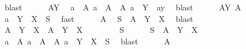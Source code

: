 \begin{isabellebody}
\ blast\isanewline
\ \ \ \ \isamarkupfalse%
\ A{\isacharunderscore}{\kern0pt}Y{}\ \isamarkupfalse%
\ a\ \ A{}{\isacharcolon}{\kern0pt}\ {\isachardoublequoteopen}a\ {\isasymin}\ A{\isachardoublequoteclose}\ \ A{}{\isacharcolon}{\kern0pt}\ {\isachardoublequoteopen}a\ {\isasyminter}\ Y\ {\isacharequal}{\kern0pt}\ a{\isacharunderscore}{\kern0pt}y{\isachardoublequoteclose}\ \isamarkupfalse%
\ blast\isanewline
\ \ \ \ \isamarkupfalse%
\ A{\isacharunderscore}{\kern0pt}Y{}\ A{}\ \isamarkupfalse%
\ {\isachardoublequoteopen}a\ {\isasyminter}\ {\isacharparenleft}{\kern0pt}Y\ {\isasyminter}\ X{\isacharparenright}{\kern0pt}\ {\isacharequal}{\kern0pt}\ S{\isachardoublequoteclose}\ \isamarkupfalse%
\ fast\isanewline
\ \ \ \ \isamarkupfalse%
\ A{}\ \isamarkupfalse%
\ {\isachardoublequoteopen}S\ {\isasymin}\ A\ {\isasyminter}{\isacharasterisk}{\kern0pt}\ {\isacharparenleft}{\kern0pt}Y\ {\isasyminter}\ X{\isacharparenright}{\kern0pt}{\isachardoublequoteclose}\ \isamarkupfalse%
\ blast\isanewline
\ \ \isamarkupfalse%
\isanewline
{}\isamarkupfalse%
\isanewline
\ \ \isamarkupfalse%
\ {\isachardoublequoteopen}A\ {\isasyminter}{\isacharasterisk}{\kern0pt}\ {\isacharparenleft}{\kern0pt}Y\ {\isasyminter}\ X{\isacharparenright}{\kern0pt}\ {\isasymsubseteq}\ A\ {\isasyminter}{\isacharasterisk}{\kern0pt}\ Y\ {\isasyminter}{\isacharasterisk}{\kern0pt}\ X{\isachardoublequoteclose}\isanewline
\ \ \isamarkupfalse%
\isanewline
\ \ \ \ \isamarkupfalse%
\ S\isanewline
\ \ \ \ \isamarkupfalse%
\ {\isachardoublequoteopen}S\ {\isasymin}\ A\ {\isasyminter}{\isacharasterisk}{\kern0pt}\ {\isacharparenleft}{\kern0pt}Y\ {\isasyminter}\ X{\isacharparenright}{\kern0pt}{\isachardoublequoteclose}\isanewline
\ \ \ \ \isamarkupfalse%
\ \isamarkupfalse%
\ a\ \ A{}{\isacharcolon}{\kern0pt}\ {\isachardoublequoteopen}a\ {\isasymin}\ A{\isachardoublequoteclose}\ \ A{}{\isacharcolon}{\kern0pt}\ {\isachardoublequoteopen}a\ {\isasyminter}\ {\isacharparenleft}{\kern0pt}Y\ {\isasyminter}\ X{\isacharparenright}{\kern0pt}\ {\isacharequal}{\kern0pt}\ S{\isachardoublequoteclose}\ \isamarkupfalse%
\ blast\isanewline
\ \ \ \ \isamarkupfalse%
\ A{}\ \isamarkupfalse%

\end{isabellebody}
